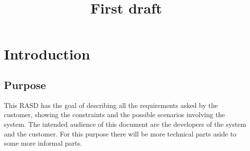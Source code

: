 \setcounter{secnumdepth}{0}
\setcounter{chapter}{0}

\title{First draft}
\chapter{Introduction}
\section{Purpose}

This RASD has the goal of describing all the requirements asked by the customer, showing the constraints and the possible scenarios involving the system.
The intended audience of this document are the developers of the system and the customer. For this purpose there will be more technical parts aside to some more informal parts.

